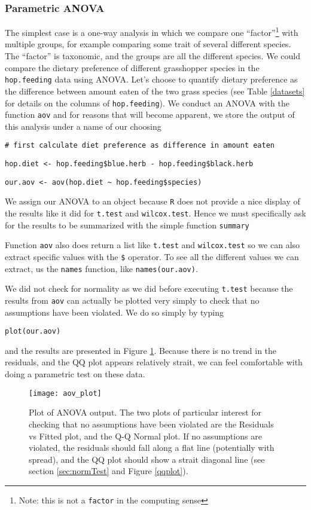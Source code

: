 \documentclass[12pt]{article}
\newcommand{\R}[1] {
	\item \texttt{#1}
}
\newenvironment{verbatim}{ 
	\indent
	\begin{list}{}{\setlength{\itemsep}{-1.5mm}}
}{
	\end{list}
}
\begin{document}
\subsubsection{Parametric ANOVA}
The simplest case is a one-way analysis in which we compare one ``factor''\footnote{Note: this is not a \texttt{factor} in the computing sense} with multiple groups, for example comparing some trait of several different species.  The ``factor'' is taxonomic, and the groups are all the different species.  We could compare the dietary preference of different grasshopper species in the \verb+hop.feeding+ data using ANOVA.  Let's choose to quantify dietary preference as the difference between amount eaten of the two grass species (see Table \ref{datasets} for details on the columns of \verb+hop.feeding+).  We conduct an ANOVA with the function \verb+aov+ and for reasons that will become apparent, we store the output of this analysis under a name of our choosing
\begin{verbatim}
	\R{\# first calculate diet preference as difference in amount eaten}
	\R{hop.diet <- hop.feeding\$blue.herb - hop.feeding\$black.herb}
	\R{our.aov <- aov(hop.diet \~{} hop.feeding\$species)}
\end{verbatim}
We assign our ANOVA to an object because \verb+R+ does not provide a nice display of the results like it did for \verb+t.test+ and \verb+wilcox.test+.  Hence we must specifically ask for the results to be summarized with the simple function \verb+summary+
\begin{quote}
	
\end{quote}
Function \verb+aov+ also does return a list like \verb+t.test+ and \verb+wilcox.test+ so we can also extract specific values with the \verb+$+ operator.  To see all the different values we can extract, us the \verb+names+ function, like \verb+names(our.aov)+.

We did not check for normality as we did before executing \verb+t.test+ because the results from \verb+aov+ can actually be plotted very simply to check that no assumptions have been violated.  We do so simply by typing
\begin{verbatim}
	\R{plot(our.aov)}
\end{verbatim}
and the results are presented in Figure \ref{aovPlot}.  Because there is no trend in the residuals, and the QQ plot appears relatively strait, we can feel comfortable with doing a parametric test on these data.

\begin{figure}[!hbt]
	\centering
	\texttt{[image: aov\_plot]}
	\caption[Plot of ANOVA output]{Plot of ANOVA output.  The two plots of particular interest for checking that no assumptions have been violated are the Residuals vs Fitted plot, and the Q-Q Normal plot.  If no assumptions are violated, the residuals should fall along a flat line (potentially with spread), and the QQ plot should show a strait diagonal line (see section \ref{sec:normTest} and Figure \ref{qqplot}).}
	\label{aovPlot}
\end{figure}
\end{document}
